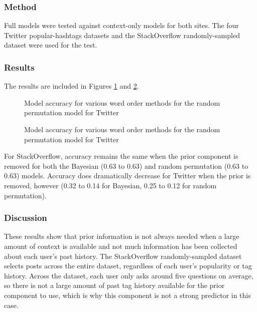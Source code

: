 \documentclass[man,floatsintext,donotrepeattitle]{apa6}
\begin{document}
\subsubsection{Method}

Full models were tested against context-only models for both sites. 
The four Twitter popular-hashtags datasets and the StackOverflow randomly-sampled dataset were used for the test. 

\subsubsection{Results}

The results are included in Figures \ref{figContextPriorneededSO} and \ref{figContextPriorneededT}.

\begin{figure}[!htbp]
  \caption{Model accuracy for various word order methods for the random permutation model for Twitter}
  \label{figContextPriorneededSO}
\end{figure}

\begin{figure}[!htbp]
  \caption{Model accuracy for various word order methods for the random permutation model for Twitter}
  \label{figContextPriorneededT}
\end{figure}

For StackOverflow, accuracy remains the same when the prior component is removed for both the Bayesian (\num{.63} to \num{.63}) and random permutation (\num{.63} to \num{.63}) models.
Accuracy does dramatically decrease for Twitter when the prior is removed, however (\num{.32} to \num{.14} for Bayesian, \num{.25} to \num{.12} for random permutation).

\subsubsection{Discussion}

These results show that prior information is not always needed when a large amount of context is available and not much information has been collected about each user's past history.
The StackOverflow randomly-sampled dataset selects posts across the entire dataset, regardless of each user's popularity or tag history.
Across the dataset, each user only asks around five questions on average, so there is not a large amount of past tag history available for the prior component to use,
which is why this component is not a strong predictor in this case.
\end{document}
